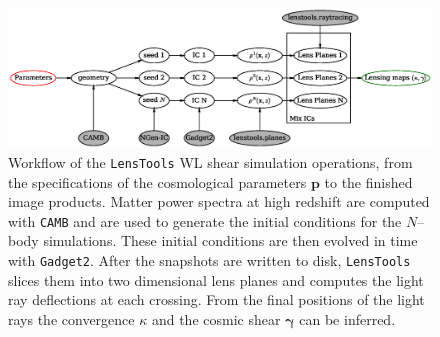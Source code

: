 \documentclass[5p]{elsarticle}
\newcommand{\bb}[1]{\mathbf{#1}}
\newcommand{\ttt}[1]{\texttt{#1}}
\newcommand{\LT}{\texttt{LensTools} }
\begin{document}
\begin{figure}
\includegraphics[scale=0.65]{Figures/flow.eps}
\caption{Workflow of the \LT WL shear simulation operations, from the specifications of the cosmological parameters $\bb{p}$ to the finished image products. Matter power spectra at high redshift are computed with \ttt{CAMB} and are used to generate the initial conditions for the $N$--body simulations. These initial conditions are then evolved in time with \ttt{Gadget2}. After the snapshots are written to disk, \LT slices them into two dimensional lens planes and computes the light ray deflections at each crossing. From the final positions of the light rays the convergence $\kappa$ and the cosmic shear $\pmb{\gamma}$ can be inferred.}
\label{pipescheme}
\end{figure}
\end{document}
